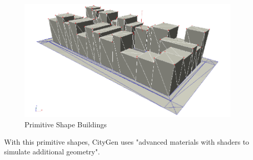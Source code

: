 \begin{figure}[htbp]
	\centering
	\includegraphics[width=0.95\textwidth]{img/CityGen/BockPrimitiveShapes.png}
	\caption{Primitive Shape Buildings}
	\label{fig:primitiveShapes}
\end{figure}

With this primitive shapes, CityGen uses "advanced materials with shaders to simulate additional geometry".



